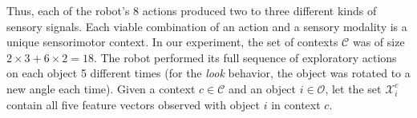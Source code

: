 Thus, each of the robot's 8 actions produced two to three different kinds of sensory signals.
Each viable combination of an action and a sensory modality is a unique sensorimotor context.
In our experiment, the set of contexts $\mathcal{C}$ was of size  $2 \times 3 + 6 \times 2 = 18$.
The robot performed its full sequence of exploratory actions on each object 5 different times (for the {\it look} behavior, the object was rotated to a new angle each time). Given a context $c \in \mathcal{C}$ and an object $i \in \mathcal{O}$, let the set $\mathcal{X}_i^c$ contain all five feature vectors observed with object $i$ in context $c$.